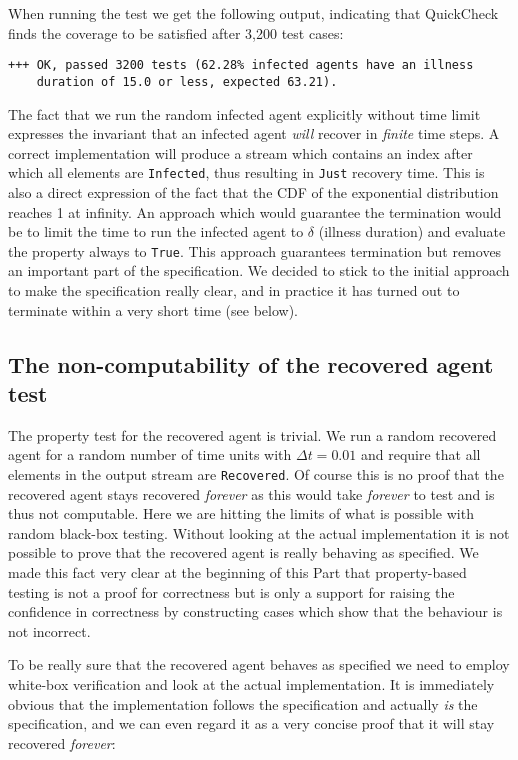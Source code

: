 When running the test we get the following output, indicating that QuickCheck finds the coverage to be satisfied after 3,200 test cases:

\begin{verbatim}
+++ OK, passed 3200 tests (62.28% infected agents have an illness 
    duration of 15.0 or less, expected 63.21).
\end{verbatim}

The fact that we run the random infected agent explicitly without time limit expresses the invariant that an infected agent \textit{will} recover in \textit{finite} time steps. A correct implementation will produce a stream which contains an index after which all elements are \texttt{Infected}, thus resulting in \texttt{Just} recovery time. This is also a direct expression of the fact that the CDF of the exponential distribution reaches 1 at infinity. An approach which would guarantee the termination would be to limit the time to run the infected agent to $\delta$ (illness duration) and evaluate the property always to \texttt{True}. This approach guarantees termination but removes an important part of the specification. We decided to stick to the initial approach to make the specification really clear, and in practice it has turned out to terminate within a very short time (see below).

\subsection{The non-computability of the recovered agent test}
The property test for the recovered agent is trivial. We run a random recovered agent for a random number of time units with $\Delta t = 0.01$ and require that all elements in the output stream are \texttt{Recovered}. Of course this is no proof that the recovered agent stays recovered \textit{forever} as this would take \textit{forever} to test and is thus not computable. Here we are hitting the limits of what is possible with random black-box testing. Without looking at the actual implementation it is not possible to prove that the recovered agent is really behaving as specified. We made this fact very clear at the beginning of this Part that property-based testing is not a proof for correctness but is only a support for raising the confidence in correctness by constructing cases which show that the behaviour is not incorrect.

To be really sure that the recovered agent behaves as specified we need to employ white-box verification and look at the actual implementation. It is immediately obvious that the implementation follows the specification and actually \textit{is} the specification, and we can even regard it as a very concise proof that it will stay recovered \textit{forever}:

